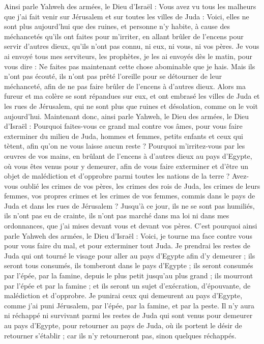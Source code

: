 \begin{multicols}{2}
Ainsi parle Yahweh des armées, le Dieu d'Israël : Vous avez vu tous les malheurs que j'ai fait venir sur Jérusalem et sur toutes les villes de Juda : Voici, elles ne sont plus aujourd'hui que des ruines, et personne n'y habite,
à cause des méchancetés qu'ils ont faites pour m'irriter, en allant brûler de l'encens pour servir d'autres dieux, qu'ils n'ont pas connu, ni eux, ni vous, ni vos pères.
Je vous ai envoyé tous mes serviteurs, les prophètes, je les ai envoyés dès le matin, pour vous dire : Ne faites pas maintenant cette chose abominable que je hais.
Mais ils n'ont pas écouté, ils n'ont pas prêté l'oreille pour se détourner de leur méchanceté, afin de ne pas faire brûler de l'encens à d'autres dieux.
Alors ma fureur et ma colère se sont répandues sur eux, et ont embrasé les villes de Juda et les rues de Jérusalem, qui ne sont plus que ruines et désolation, comme on le voit aujourd'hui.
Maintenant donc, ainsi parle Yahweh, le Dieu des armées, le Dieu d'Israël : Pourquoi faites-vous ce grand mal contre vos âmes, pour vous faire exterminer du milieu de Juda, hommes et femmes, petits enfants et ceux qui tètent, afin qu'on ne vous laisse aucun reste ?
Pourquoi m'irritez-vous par les œuvres de vos mains, en brûlant de l'encens à d'autres dieux au pays d'Egypte, où vous êtes venus pour y demeurer, afin de vous faire exterminer et d'être un objet de malédiction et d'opprobre parmi toutes les nations de la terre ?
Avez-vous oublié les crimes de vos pères, les crimes des rois de Juda, les crimes de leurs femmes, vos propres crimes et les crimes de vos femmes, commis dans le pays de Juda et dans les rues de Jérusalem ?
Jusqu'à ce jour, ils ne se sont pas humiliés, ils n'ont pas eu de crainte, ils n'ont pas marché dans ma loi ni dans mes ordonnances, que j'ai mises devant vous et devant vos pères.
C'est pourquoi ainsi parle Yahweh des armées, le Dieu d'Israël : Voici, je tourne ma face contre vous pour vous faire du mal, et pour exterminer tout Juda.
Je prendrai les restes de Juda qui ont tourné le visage pour aller au pays d'Egypte afin d'y demeurer ; ils seront tous consumés, ils tomberont dans le pays d'Egypte ; ils seront consumés par l'épée, par la famine, depuis le plus petit jusqu'au plus grand ; ils mourront par l'épée et par la famine ; et ils seront un sujet d'exécration, d'épouvante, de malédiction et d'opprobre.
Je punirai ceux qui demeurent au pays d'Egypte, comme j'ai puni Jérusalem, par l'épée, par la famine, et par la peste.
Il n'y aura ni réchappé ni survivant parmi les restes de Juda qui sont venus pour demeurer au pays d'Egypte, pour retourner au pays de Juda, où ils portent le désir de retourner s'établir ; car ils n'y retourneront pas, sinon quelques réchappés.

\end{multicols}
